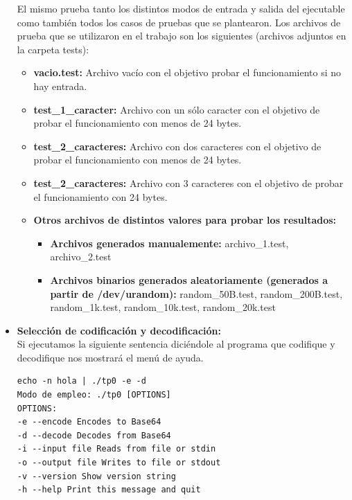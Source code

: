 \documentclass[a4paper,10pt, fleqn]{article}
\begin{document}
\begin{itemize}
El mismo prueba tanto los distintos modos de entrada y salida del ejecutable como también todos los casos de pruebas que se plantearon.
Los archivos de prueba que se utilizaron en el trabajo son los siguientes (archivos adjuntos en la carpeta tests):\\
\begin{itemize}

\item \textbf{vacio.test:} Archivo vacío con el objetivo probar el funcionamiento si no hay entrada.\\

\item \textbf{test\_1\_caracter:} Archivo con un sólo caracter con el objetivo de probar el funcionamiento con menos de 24 bytes.

\item \textbf{test\_2\_caracteres:} Archivo con dos caracteres con el objetivo de probar el funcionamiento con menos de 24 bytes.

\item \textbf{test\_2\_caracteres:} Archivo con 3 caracteres con el objetivo de probar el funcionamiento con 24 bytes.

\item \textbf{Otros archivos de distintos valores para probar los resultados:}\\
\begin{itemize}
	\item \textbf{Archivos generados manualemente:} archivo\_1.test, archivo\_2.test\\
	\item \textbf{Archivos binarios generados aleatoriamente (generados a partir de /dev/urandom):} random\_50B.test, random\_200B.test, random\_1k.test, random\_10k.test, random\_20k.test \\
\end{itemize}
\end{itemize}
		
      \item \textbf{Selección de codificación y decodificación: }\\
      Si ejecutamos la siguiente sentencia diciéndole al programa que codifique y decodifique nos mostrará el menú de ayuda.\\
      \begin{verbatim}
echo -n hola | ./tp0 -e -d
Modo de empleo: ./tp0 [OPTIONS]
OPTIONS:
-e --encode Encodes to Base64
-d --decode Decodes from Base64
-i --input file Reads from file or stdin
-o --output file Writes to file or stdout
-v --version Show version string
-h --help Print this message and quit


\end{verbatim}
\end{itemize}
\end{document}
